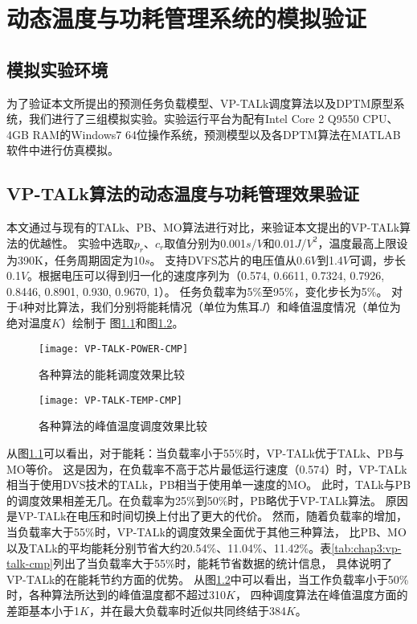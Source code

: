 


\chapter{动态温度与功耗管理系统的模拟验证}
\label{cha:DPTMexperiments}

\section{模拟实验环境}
为了验证本文所提出的预测任务负载模型、VP-TALk调度算法以及DPTM原型系统，我们进行了三组模拟实验。实验运行平台为配有Intel Core 2 Q9550 CPU、4GB RAM的Windows7 64位操作系统，预测模型以及各DPTM算法在MATLAB软件中进行仿真模拟。

\section{VP-TALk算法的动态温度与功耗管理效果验证}
本文通过与现有的TALk、PB、MO算法进行对比，来验证本文提出的VP-TALk算法的优越性。 实验中选取$p_r$、$c_r$取值分别为0.001$s$/$V$和0.01$J$/$V^2$，温度最高上限设为390K，任务周期固定为10$s$。 支持DVFS芯片的电压值从0.6$V$到1.4$V$可调，步长0.1$V$。根据电压可以得到归一化的速度序列为（0.574, 0.6611, 0.7324, 0.7926, 0.8446, 0.8901, 0.930, 0.9670, 1）。 任务负载率为5\%至95\%，变化步长为5\%。 对于4种对比算法，我们分别将能耗情况（单位为焦耳$J$）和峰值温度情况（单位为绝对温度$K$）绘制于 图\ref{fig:vp-talk-power-cmp}和图\ref{fig:vp-talk-temp-cmp}。
\begin{figure}[H]
  \centering
  \texttt{[image: VP-TALK-POWER-CMP]}
  \caption{各种算法的能耗调度效果比较}
  \label{fig:vp-talk-power-cmp}
\end{figure}
\begin{figure}[H]
  \centering
  \texttt{[image: VP-TALK-TEMP-CMP]}
  \caption{各种算法的峰值温度调度效果比较}
  \label{fig:vp-talk-temp-cmp}
\end{figure}
从图\ref{fig:vp-talk-power-cmp}可以看出，对于能耗：当负载率小于55\%时，VP-TALk优于TALk、PB与MO等价。 这是因为，在负载率不高于芯片最低运行速度（0.574）时，VP-TALk相当于使用DVS技术的TALk，PB相当于使用单一速度的MO。 此时，TALk与PB的调度效果相差无几。在负载率为25\%到50\%时，PB略优于VP-TALk算法。 原因是VP-TALk在电压和时间切换上付出了更大的代价。 然而，随着负载率的增加，当负载率大于55\%时，VP-TALk的调度效果全面优于其他三种算法， 比PB、MO以及TALk的平均能耗分别节省大约20.54\%、11.04\%、11.42\%。表\ref{tab:chap3:vp-talk-cmp}列出了当负载率大于55\%时，能耗节省数据的统计信息， 具体说明了VP-TALk的在能耗节约方面的优势。
从图\ref{fig:vp-talk-temp-cmp}中可以看出，当工作负载率小于50\%时，各种算法所达到的峰值温度都不超过310$K$， 四种调度算法在峰值温度方面的差距基本小于1$K$，并在最大负载率时近似共同终结于384$K$。

